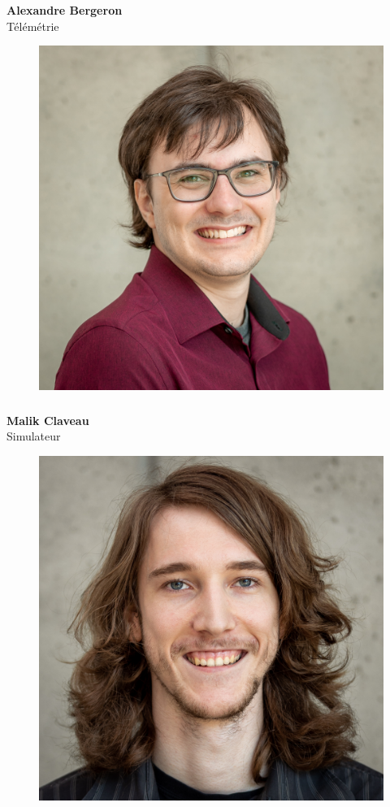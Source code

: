 \documentclass[a0paper,portrait]{baposter}
\begin{document}
\begin{poster}
{\subsubsection*{}
\vspace{2mm}
\textbf{Alexandre Bergeron}\\
Télémétrie

\begin{figure}
\includegraphics[width=.9\linewidth]{img/membres/Malik-Claveau-2.jpg} 
\end{figure}
\subsubsection*{}
\vspace{2mm}
\textbf{Malik Claveau}\\
Simulateur

\begin{figure}
\includegraphics[width=.9\linewidth]{img/membres/Claude-Garrison-Pelletier-2.jpg} 
\end{figure}
}
\end{poster}
\end{document}
